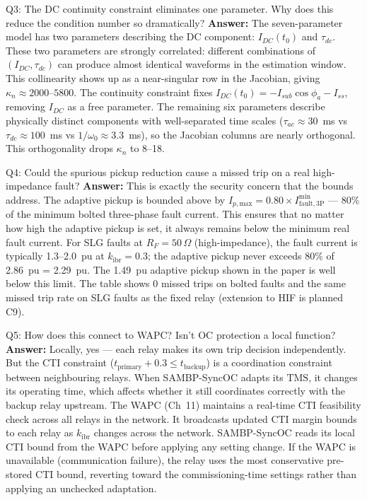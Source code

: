 \documentclass[12pt,a4paper]{article}
\newcommand{\kibr}{k_\mathrm{ibr}}
\newcommand{\TMS}{\mathrm{TMS}}
\begin{document}
\begin{keybox}{Q3: The DC continuity constraint eliminates one parameter. Why does this reduce the condition number so dramatically?}
\textbf{Answer:} The seven-parameter model has two parameters describing the DC component: $I_{DC}(t_0)$ and $\tau_{dc}$. These two parameters are strongly correlated: different combinations of $(I_{DC}, \tau_{dc})$ can produce almost identical waveforms in the estimation window. This collinearity shows up as a near-singular row in the Jacobian, giving $\kappa_n \approx 2000$--$5800$. The continuity constraint fixes $I_{DC}(t_0) = -I_{sub}\cos\phi_a - I_{ss}$, removing $I_{DC}$ as a free parameter. The remaining six parameters describe physically distinct components with well-separated time scales ($\tau_{ac} \approx 30$~ms vs $\tau_{dc} \approx 100$~ms vs $1/\omega_0 \approx 3.3$~ms), so the Jacobian columns are nearly orthogonal. This orthogonality drops $\kappa_n$ to 8--18.
\end{keybox}

\begin{keybox}{Q4: Could the spurious pickup reduction cause a missed trip on a real high-impedance fault?}
\textbf{Answer:} This is exactly the security concern that the bounds address. The adaptive pickup is bounded above by $I_{p,\mathrm{max}} = 0.80 \times I_\mathrm{fault,3P}^\mathrm{min}$ --- 80\% of the minimum bolted three-phase fault current. This ensures that no matter how high the adaptive pickup is set, it always remains below the minimum real fault current. For SLG faults at $R_F = 50\,\Omega$ (high-impedance), the fault current is typically 1.3--2.0~pu at $\kibr = 0.3$; the adaptive pickup never exceeds 80\% of 2.86~pu = 2.29~pu. The 1.49~pu adaptive pickup shown in the paper is well below this limit. The table shows 0 missed trips on bolted faults and the same missed trip rate on SLG faults as the fixed relay (extension to HIF is planned C9).
\end{keybox}

\begin{keybox}{Q5: How does this connect to WAPC? Isn't OC protection a local function?}
\textbf{Answer:} Locally, yes --- each relay makes its own trip decision independently. But the CTI constraint ($t_\mathrm{primary} + 0.3 \leq t_\mathrm{backup}$) is a coordination constraint between neighbouring relays. When SAMBP-SyncOC adapts its $\TMS$, it changes its operating time, which affects whether it still coordinates correctly with the backup relay upstream. The WAPC (Ch~11) maintains a real-time CTI feasibility check across all relays in the network. It broadcasts updated CTI margin bounds to each relay as $\kibr$ changes across the network. SAMBP-SyncOC reads its local CTI bound from the WAPC before applying any setting change. If the WAPC is unavailable (communication failure), the relay uses the most conservative pre-stored CTI bound, reverting toward the commissioning-time settings rather than applying an unchecked adaptation.
\end{keybox}
\end{document}
